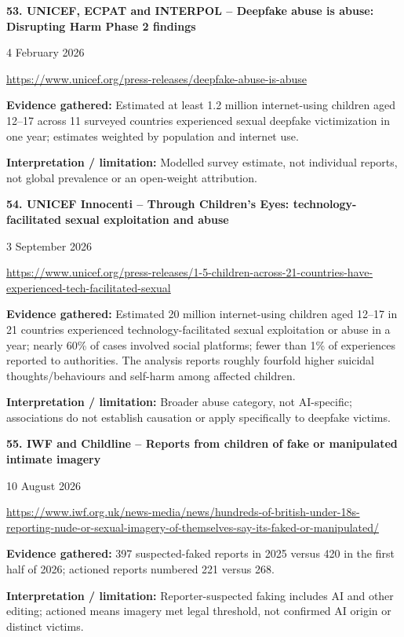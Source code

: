 \documentclass[11pt,a4paper]{article}
\begin{document}
\noindent\begin{minipage}{\linewidth}\textbf{53. UNICEF, ECPAT and INTERPOL -- Deepfake abuse is abuse: Disrupting Harm Phase 2 findings}\par{\small 4 February 2026\par\url{https://www.unicef.org/press-releases/deepfake-abuse-is-abuse}}\par
\textbf{Evidence gathered:} Estimated at least 1.2 million internet-using children aged 12--17 across 11 surveyed countries experienced sexual deepfake victimization in one year; estimates weighted by population and internet use.\par\textbf{Interpretation / limitation:} Modelled survey estimate, not individual reports, not global prevalence or an open-weight attribution.\par
\end{minipage}\par\vspace{2mm}
\noindent\begin{minipage}{\linewidth}\textbf{54. UNICEF Innocenti -- Through Children's Eyes: technology-facilitated sexual exploitation and abuse}\par{\small 3 September 2026\par\url{https://www.unicef.org/press-releases/1-5-children-across-21-countries-have-experienced-tech-facilitated-sexual}}\par
\textbf{Evidence gathered:} Estimated 20 million internet-using children aged 12--17 in 21 countries experienced technology-facilitated sexual exploitation or abuse in a year; nearly 60\% of cases involved social platforms; fewer than 1\% of experiences reported to authorities. The analysis reports roughly fourfold higher suicidal thoughts/behaviours and self-harm among affected children.\par\textbf{Interpretation / limitation:} Broader abuse category, not AI-specific; associations do not establish causation or apply specifically to deepfake victims.\par
\end{minipage}\par\vspace{2mm}
\noindent\begin{minipage}{\linewidth}\textbf{55. IWF and Childline -- Reports from children of fake or manipulated intimate imagery}\par{\small 10 August 2026\par\url{https://www.iwf.org.uk/news-media/news/hundreds-of-british-under-18s-reporting-nude-or-sexual-imagery-of-themselves-say-its-faked-or-manipulated/}}\par
\textbf{Evidence gathered:} 397 suspected-faked reports in 2025 versus 420 in the first half of 2026; actioned reports numbered 221 versus 268.\par\textbf{Interpretation / limitation:} Reporter-suspected faking includes AI and other editing; actioned means imagery met legal threshold, not confirmed AI origin or distinct victims.\par
\end{minipage}\par\vspace{2mm}
\end{document}
